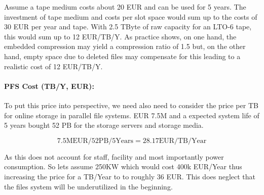 \documentclass{../../template/esiwace-report}
\begin{document}
Assume a tape medium costs about 20 EUR and can be used for 5 years. 
The investment of tape medium and costs per slot space would sum up to the costs of 30 EUR per year and tape.
With 2.5 TByte of raw capacity for an LTO-6 tape, this would sum up to 12 EUR/TB/Y. 
As practice shows, on one hand, the embedded compression may yield a compression ratio of 1.5 but, on the other hand, 
empty space due to deleted files may compensate for this leading to a realistic cost of 12 EUR/TB/Y.



\paragraph{PFS Cost (TB/Y, EUR):}
\label{calc:PFS EUR/TB/Y}

To put this price into perspective, we need also need to consider the price per TB for online storage in parallel file systems.
EUR 7.5M and a expected system life of 5 years bought 52 PB for the storage servers and storage media.

$$7.5\mathrm{M EUR} / 52 \mathrm{PB} / 5 \mathrm{Years} = 28.17 \mathrm{EUR/TB/Year}$$

As this does not account for staff, facility and most importantly power consumption. So lets assume 250KW which would cost 400k EUR/Year thus increasing the price for a TB/Year to to roughly 36 EUR.
This does neglect that the files system will be underutilized in the beginning.



%
%
\end{document}
